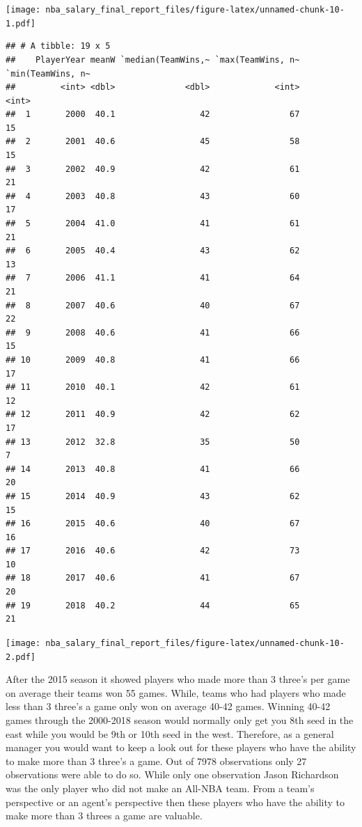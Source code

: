 \documentclass[]{article}
\begin{document}
\texttt{[image: nba\_salary\_final\_report\_files/figure-latex/unnamed-chunk-10-1.pdf]}

\begin{verbatim}
## # A tibble: 19 x 5
##    PlayerYear meanW `median(TeamWins,~ `max(TeamWins, n~ `min(TeamWins, n~
##         <int> <dbl>              <dbl>             <int>             <int>
##  1       2000  40.1                 42                67                15
##  2       2001  40.6                 45                58                15
##  3       2002  40.9                 42                61                21
##  4       2003  40.8                 43                60                17
##  5       2004  41.0                 41                61                21
##  6       2005  40.4                 43                62                13
##  7       2006  41.1                 41                64                21
##  8       2007  40.6                 40                67                22
##  9       2008  40.6                 41                66                15
## 10       2009  40.8                 41                66                17
## 11       2010  40.1                 42                61                12
## 12       2011  40.9                 42                62                17
## 13       2012  32.8                 35                50                 7
## 14       2013  40.8                 41                66                20
## 15       2014  40.9                 43                62                15
## 16       2015  40.6                 40                67                16
## 17       2016  40.6                 42                73                10
## 18       2017  40.6                 41                67                20
## 19       2018  40.2                 44                65                21
\end{verbatim}

\texttt{[image: nba\_salary\_final\_report\_files/figure-latex/unnamed-chunk-10-2.pdf]}

After the 2015 season it showed players who made more than 3 three's per
game on average their teams won 55 games. While, teams who had players
who made less than 3 three's a game only won on average 40-42 games.
Winning 40-42 games through the 2000-2018 season would normally only get
you 8th seed in the east while you would be 9th or 10th seed in the
west. Therefore, as a general manager you would want to keep a look out
for these players who have the ability to make more than 3 three's a
game. Out of 7978 observations only 27 observations were able to do so.
While only one observation Jason Richardson was the only player who did
not make an All-NBA team. From a team's perspective or an agent's
perspective then these players who have the ability to make more than 3
threes a game are valuable.
\end{document}
